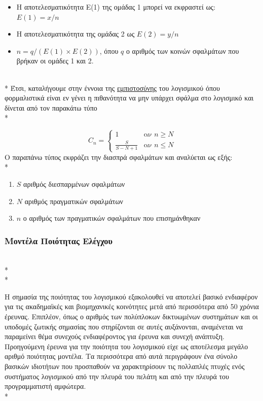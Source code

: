 \documentclass[a4paper, 11pt]{article}
\begin{document}
{{\begin{itemize}
\item Η αποτελεσματικότητα Ε(1) της ομάδας 1 μπορεί να εκφραστεί ως:  \(E(1) = x / n\)
\item Η αποτελεσματικότητα της ομάδας 2 ως \(E(2) = y / n\)
\item \(n = q / (E(1) × E(2))\), όπου \(q\) ο αριθμός των κοινών σφαλμάτων που βρήκαν οι ομάδες 1 και 2.
\end{itemize}
\\*
Έτσι, καταλήγουμε στην έννοια της \underline{εμπιστοσύνης} του λογισμικού όπου φορμαλιστικά είναι εν γένει η πιθανότητα να μην υπάρχει σφάλμα στο λογισμικό και δίνεται από τον παρακάτω τύπο \\*

\[C_n =
\left\{
	\begin{array}{ll}
		1  & \mbox{αν } n \geq N \\
		\frac{S}{S - N + 1} & \mbox{αν } n \leq N
	\end{array}
\right.\]
Ο παραπάνω τύπος εκφράζει την διασπρά σφαλμάτων και αναλύεται ως εξής:\\*
\begin{enumerate}
\item \(S\) αριθμός διεσπαρμένων σφαλμάτων
\item \(N\) αριθμός πραγματικών σφαλμάτων
\item \(n\) ο αριθμός των πραγματικών σφαλμάτων που επισημάνθηκαν
\end{enumerate}






\subsubsection{Μοντέλα Ποιότητας Ελέγχου}
\\*
\\*

Η σημασία της ποιότητας του λογισμικού εξακολουθεί να αποτελεί βασικό ενδιαφέρον για 
τις ακαδημαϊκές και βιομηχανικές κοινότητες μετά από περισσότερα από 50 χρόνια έρευνας. Επιπλέον, όπως ο αριθμός των πολύπλοκων δικτυωμένων συστημάτων και
οι υποδομές ζωτικής σημασίας που στηρίζονται σε αυτές αυξάνονται, αναμένεται να παραμείνει 
θέμα συνεχούς ενδιαφέροντος για έρευνα και συνεχή ανάπτυξη.
Προηγούμενη έρευνα για την ποιότητα του λογισμικού είχε ως αποτέλεσμα μεγάλο αριθμό ποιότητας
μοντέλα. Τα περισσότερα από αυτά περιγράφουν ένα σύνολο βασικών ιδιοτήτων που προσπαθούν να χαρακτηρίσουν τις πολλαπλές πτυχές ενός συστήματος λογισμικού από την πλευρά του πελάτη και από την πλευρά του προγραμματιστή αμφώτερα.
\\*



}}
\end{document}
